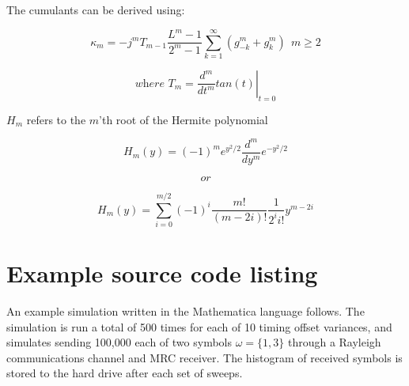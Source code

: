 The cumulants can be derived using:

$$
\kappa_m = - j^m T_{m-1} \frac{L^m - 1}{2^m - 1} \sum\limits_{k=1}^{\infty} \left ( g_{-k}^m + g_k^m \right ) \: \: m \ge 2
$$

$$
\textit{where   } T_m = \left . \frac{d^m}{d t^m} tan (t) \right |_{t=0}
$$

$H_m$ refers to the $m$'th root of the Hermite polynomial

$$
H_m (y) = (-1)^m e^{y^2 / 2} \frac{d^m}{d y^m} e^{- y^2 / 2}
$$

$$
\textit{or}
$$

$$
H_m (y) = \sum\limits_{i=0}^{m / 2} (-1)^i \frac{m!}{(m-2i)!} \frac{1}{2^i i!} y^{m-2i}
$$

\chapter{Example source code listing}

An example simulation written in the Mathematica language follows. The simulation is run a total of 500 times for each of 10 timing offset variances, and simulates sending 100,000 each of two symbols $\omega = \{ 1,3 \}$ through a Rayleigh communications channel and MRC receiver. The histogram of received symbols is stored to the hard drive after each set of sweeps.





\cleardoublepage %




